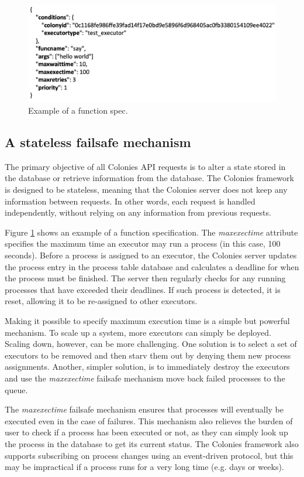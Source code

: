 \documentclass{article}
\begin{document}
\begin{figure}[h]
	\centering
    \includegraphics[scale=0.35]{function_spec.png}
	\caption{Example of a function spec.}
	\label{fig:function_spec}
\end{figure}

\subsection{A stateless failsafe mechanism}
The primary objective of all Colonies API requests is to alter a state stored in the database or retrieve information from the database. The Colonies framework is designed to be stateless, meaning that the Colonies server does not keep any information between requests. In other words, each request is handled independently, without relying on any information from previous requests. 

Figure \ref{fig:function_spec} shows an example of a function specification. The \emph{maxexectime} attribute specifies the maximum time an executor may run a process (in this case, 100 seconds). Before a process is assigned to an executor, the Colonies server updates the process entry in the process table database and calculates a deadline for when the process must be finished. The server then regularly checks for any running processes that have exceeded their deadlines. If such process is detected, it is reset, allowing it to be re-assigned to other executors. 

Making it possible to specify maximum execution time is a simple but powerful mechanism. To scale up a system, more executors can simply be deployed. Scaling down, however, can be more challenging. One solution is to select a set of executors to be removed and then starv them out by denying them new process assignments. Another, simpler solution, is to immediately destroy the executors and use the \emph{maxexectime} failsafe mechanism move back failed processes to the queue.  

The \emph{maxexectime} failsafe mechanism ensures that processes will eventually be executed even in the case of failures. This mechanism also relieves the burden of user to check if a process has been executed or not, as they can simply look up the process in the database to get its current status. The Colonies framework also supports subscribing on process changes using an event-driven protocol, but this may be impractical if a process runs for a very long time (e.g. days or weeks).
\end{document}
